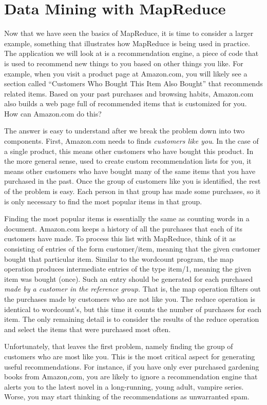 \section{Data Mining with MapReduce}

Now that we have seen the basics of MapReduce, it is time to consider
a larger example, something that illustrates how MapReduce is being
used in practice.  The application we will look at is a recommendation
engine, a piece of code that is used to recommend new things to you based
on other things you like.  For example, when you visit a product page at
Amazon.com, you will likely see a section called ``Customers Who Bought
This Item Also Bought'' that recommends related items.  Based on your
past purchases and browsing habits, Amazon.com also builds a web page
full of recommended items that is customized for you.  How can Amazon.com
do this?

The answer is easy to understand after we break the problem down into
two components.  First, Amazon.com needs to finds \textit{customers like
you}.  In the case of a single product, this means other customers who
have bought this product.  In the more general sense, used to create custom
recommendation lists for you, it means other customers who have bought many
of the same items that you have purchased in the past.  Once the group of
customers like you is identified, the rest of the problem is easy.  Each
person in that group has made some purchases, so it is only necessary to
find the most popular items in that group.

Finding the most popular items is essentially the same as counting words
in a document.
Amazon.com keeps a history of all the purchases that each of its
customers have made.  To process this list with MapReduce, think of it as
consisting of entries of the form customer/item, meaning that the given
customer bought that particular item.  Similar to the wordcount program,
the map operation produces intermediate entries of the type item/1, meaning
the given item was bought (once).  Such an entry should be generated for
each purchased \textit{made by a customer in the reference group.}  That is,
the map operation filters out the purchases made by customers who are
not like you.  The reduce operation is identical to wordcount's, but this
time it counts the number of purchases for each item.  The only remaining
detail is to consider the results of the reduce operation and select the
items that were purchased most often.

Unfortunately, that leaves the first problem, namely finding the group of
customers who are most like you.  This is the most critical aspect for
generating useful recommendations.  For instance, if you have only ever
purchased gardening books from Amazon,com, you are likely to ignore a
recommendation engine that alerts you to the latest novel in a long-running,
young adult, vampire series.  Worse, you may start thinking of the recommendations
as unwarranted spam.

